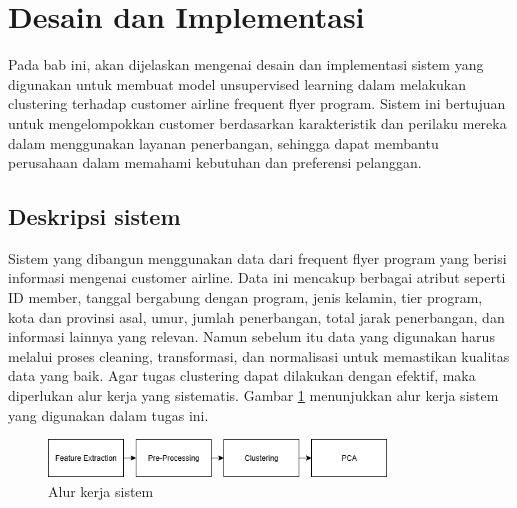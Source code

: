 \newpage
\section{Desain dan Implementasi}
Pada bab ini, akan dijelaskan mengenai desain dan implementasi sistem yang digunakan untuk membuat model unsupervised learning dalam melakukan clustering terhadap customer airline frequent flyer program. Sistem ini bertujuan untuk mengelompokkan customer berdasarkan karakteristik dan perilaku mereka dalam menggunakan layanan penerbangan, sehingga dapat membantu perusahaan dalam memahami kebutuhan dan preferensi pelanggan.


\subsection{Deskripsi sistem}
Sistem yang dibangun menggunakan data dari frequent flyer program yang berisi informasi mengenai customer airline. Data ini mencakup berbagai atribut seperti ID member, tanggal bergabung dengan program, jenis kelamin, tier program, kota dan provinsi asal, umur, jumlah penerbangan, total jarak penerbangan, dan informasi lainnya yang relevan. Namun sebelum itu data yang digunakan harus melalui proses cleaning, transformasi, dan normalisasi untuk memastikan kualitas data yang baik. Agar tugas clustering dapat dilakukan dengan efektif, maka diperlukan alur kerja yang sistematis. Gambar \ref{fig:flowchart} menunjukkan alur kerja sistem yang digunakan dalam tugas ini.

\begin{figure}[H]
    \centering
    \includegraphics[width=0.8\textwidth]{gambar/flowchart.png}
    \caption{Alur kerja sistem}
    \label{fig:flowchart}
\end{figure}

